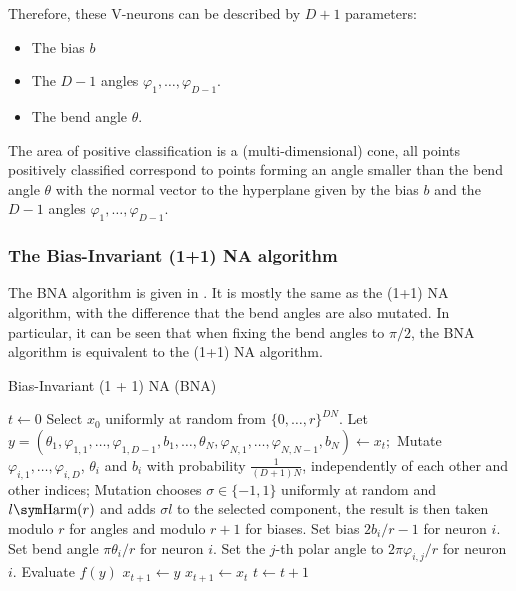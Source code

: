 Therefore, these V-neurons can be described by $D + 1$ parameters:

\begin{itemize}
    \item The bias $b$
    \item The $D - 1$ angles $\varphi_1, \ldots, \varphi_{D-1}$.
    \item The bend angle $\theta$.
\end{itemize}

The area of positive classification is a (multi-dimensional) cone, all points positively classified correspond to points forming an angle smaller than the bend
angle $\theta$ with the normal vector to the hyperplane given by the bias $b$ and the $D -1$ angles $\varphi_1, \ldots, \varphi_{D-1}$.


\subsubsection{The Bias-Invariant (1+1) NA algorithm}

The BNA algorithm is given in .
It is mostly the same as the (1+1) NA algorithm, with the difference that the bend angles are also mutated.
In particular, it can be seen that when fixing the bend angles to $\pi / 2$, the BNA algorithm is equivalent to the (1+1) NA algorithm.

\begin{algorithm}
    \caption{Bias-Invariant (1 + 1) NA (BNA)}
\label{alg:bna}
\begin{algorithmic}
    \State $t \gets 0$
    \State Select $x_0$ uniformly at random from $\{0, \ldots, r\}^{DN}$.
        \State Let $y = (\theta_1, \varphi_{1,1}, \ldots, \varphi_{1,D-1}, b_1, \ldots, \theta_N, \varphi_{N,1}, \ldots, \varphi_{N,N-1}, b_N) \gets x_t;$
            \State Mutate $\varphi_{i,1}, \dots, \varphi_{i,D}$, $\theta_i$ and $b_i$ with probability $\frac{1}{(D+1) N}$, independently of each other and other indices;
            \State Mutation chooses $\sigma \in \{-1, 1\}$ uniformly at random and $l \sym \text{Harm}(r)$ and adds $\sigma l$ to the selected component, the
            result is then taken modulo $r$ for angles and modulo $r + 1$ for biases.
                \State Set bias $2b_i / r - 1$ for neuron $i$.
                \State Set bend angle $\pi \theta_i / r$ for neuron $i$.
                    \State Set the $j$-th polar angle to $2\pi \varphi_{i,j} / r$ for neuron $i$.
                \EndFor
            \EndFor
            \State Evaluate $f(y)$
                \State $x_{t+1} \gets y$
            \Else
                \State $x_{t+1} \gets x_t$
            \EndIf
        \EndFor
        \State $t \gets t + 1$
    \EndWhile
\end{algorithmic}
\end{algorithm}

